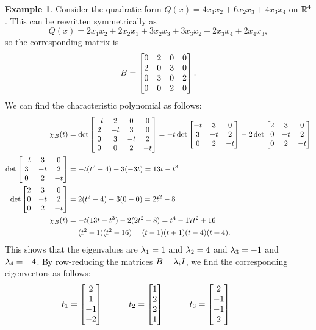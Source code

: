 \documentclass[reqno]{amsart}
\theoremstyle{definition}
\newtheorem{example}[theorem]{Example}
\begin{document}
\begin{example}\label{eg-quadratic-diag-ii}
 Consider the quadratic form $Q(x)=4x_1x_2+6x_2x_3+4x_3x_4$ on
 ${\mathbb{R}}^4$.  This can be rewritten symmetrically as
 \[ Q(x) =
     2x_1x_2 + 2x_2x_1 + 3x_2x_3 + 3 x_3x_2 + 2 x_3x_4 + 2x_4x_3,
 \]
 so the corresponding matrix is
 \[ B = \left[\begin{matrix} 0 & 2 & 0 & 0 \\
             2 & 0 & 3 & 0 \\
             0 & 3 & 0 & 2 \\
             0 & 0 & 2 & 0 \end{matrix}\right].
 \]
 We can find the characteristic polynomial as follows:
 \begin{align*}
  \chi_B(t) &=
   \det 
    \left[\begin{matrix} -t &  2 &  0 &  0 \\
          2 & -t &  3 &  0 \\
          0 &  3 & -t &  2 \\
          0 &  0 &  2 & -t \end{matrix}\right] 
   = 
   -t \det \left[\begin{matrix} -t & 3 & 0 \\ 3 & -t & 2 \\ 0 & 2 & -t \end{matrix}\right] 
   -2 \det \left[\begin{matrix} 2 & 3 & 0 \\ 0 & -t & 2 \\ 0 & 2 & -t \end{matrix}\right] \\
  \det \left[\begin{matrix} -t & 3 & 0 \\ 3 & -t & 2 \\ 0 & 2 & -t \end{matrix}\right] &=
   -t(t^2-4) - 3(-3t) = 13t - t^3 \\
  \det \left[\begin{matrix} 2 & 3 & 0 \\ 0 & -t & 2 \\ 0 & 2 & -t \end{matrix}\right] &= 
   2(t^2-4) - 3(0-0) = 2t^2-8 \\
  \chi_B(t) &= -t(13t-t^3) -2(2t^2-8) = t^4-17t^2+16 \\
   &= (t^2-1)(t^2-16) = (t-1)(t+1)(t-4)(t+4).
 \end{align*}
 This shows that the eigenvalues are $\lambda_1=1$ and $\lambda_2=4$ and
 $\lambda_3=-1$ and $\lambda_4=-4$.  By row-reducing the matrices $B-\lambda_iI$,
 we find the corresponding eigenvectors as follows:
 \[ t_1 = \left[\begin{matrix}  2 \\  1 \\ -1 \\ -2 \end{matrix}\right] \hspace{3em}
    t_2 = \left[\begin{matrix}  1 \\  2 \\  2 \\  1 \end{matrix}\right] \hspace{3em}
    t_3 = \left[\begin{matrix}  2 \\ -1 \\ -1 \\  2 \end{matrix}\right] \hspace{3em}
\]
\end{example}
\end{document}
